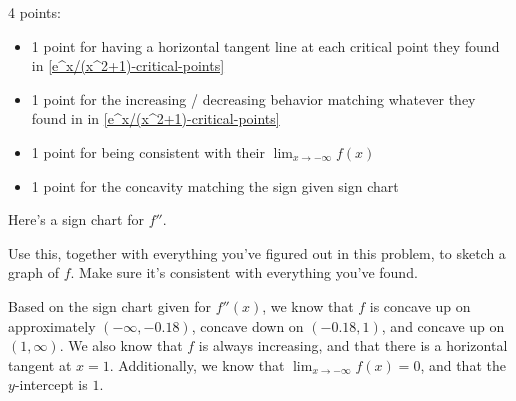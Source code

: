 \documentclass{article}
\begin{document}
\begin{enumerate}
\begin{enumerate}
    \begin{grading}
      4 points:
      \begin{itemize}[nosep]
      \item 1 point for having a horizontal tangent line at each critical point they found in \ref{e^x/(x^2+1)-critical-points}
      \item 1 point for the increasing / decreasing behavior matching whatever they found in in \ref{e^x/(x^2+1)-critical-points}
      \item 1 point for being consistent with their $\displaystyle \lim_{x \to -\infty} f(x)$
      \item 1 point for the concavity matching the sign given sign chart
      \end{itemize}
    \end{grading}

    \begin{problem}[\vfill\newpage]
      Here's a sign chart for $f''$.
      \begin{center}
      \end{center}
      Use this, together with everything you've figured out in this problem, to sketch a graph of $f$. Make sure it's consistent with everything you've found. 
    \end{problem}

    \begin{solution}
      Based on the sign chart given for $f''(x)$, we know that $f$ is concave up on
      approximately $(-\infty, -0.18)$, concave down on $(-0.18, 1)$, and concave
      up on $(1, \infty)$. We also know that $f$ is always increasing, and
      that there is a horizontal tangent at $x=1$. Additionally, we know that
      $\lim_{x \to -\infty} f(x) = 0$, and that the $y$-intercept is $1$. 
      \begin{center}
      \end{center}
    \end{solution}


\end{enumerate}
\end{enumerate}
\end{document}
